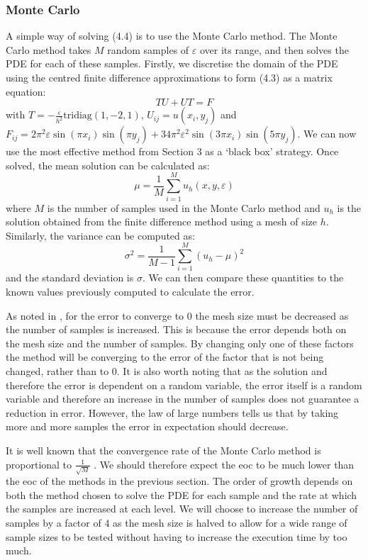 \documentclass[11pt]{article}
\numberwithin{equation}{section}
\begin{document}
\subsubsection{Monte Carlo}
A simple way of solving (4.4) is to use the Monte Carlo method. The Monte Carlo method takes $M$ random samples of $\varepsilon$ over its range, and then solves the PDE for each of these samples. Firstly, we discretise the domain of the PDE using the centred finite difference approximations to form (4.3) as a matrix equation:
\begin{equation}
TU + UT = F
\end{equation}
with $T = -\frac{\varepsilon}{h^2} \text{tridiag}(1,-2,1)$, $U_{ij} = u(x_i, y_j)$ and $F_{ij} = 2\pi^2 \varepsilon \sin(\pi x_i) \sin(\pi y_j)+ 34 \pi^2 \varepsilon^2 \sin(3 \pi x_i) \sin(5 \pi y_j)$. We can now use the most effective method from Section 3 as a `black box' strategy. Once solved, the mean solution can be calculated as:
\begin{equation}
\mu = \frac{1}{M} \sum_{i=1}^M u_h (x, y, \varepsilon)
\end{equation}
where $M$ is the number of samples used in the Monte Carlo method and $u_h$ is the solution obtained from the finite difference method using a mesh of size $h$. Similarly, the variance can be computed as:
\begin{equation}
\sigma^2 = \frac{1}{M-1}\sum_{i=1}^M (u_h - \mu)^2
\end{equation}
and the standard deviation is $\sigma$. We can then compare these quantities to the known values previously computed to calculate the error.

As noted in \cite{Bishop}, for the error to converge to 0 the mesh size must be decreased as the number of samples is increased. This is because the error depends both on the mesh size and the number of samples. By changing only one of these factors the method will be converging to the error of the factor that is not being changed, rather than to 0. It is also worth noting that as the solution and therefore the error is dependent on a random variable, the error itself is a random variable and therefore an increase in the number of samples does not guarantee a reduction in error. However, the law of large numbers tells us that by taking more and more samples the error in expectation should decrease.

It is well known that the convergence rate of the Monte Carlo method is proportional to $\frac{1}{\sqrt{M}}$ \cite{Kalos}. We should therefore expect the eoc to be much lower than the eoc of the methods in the previous section. The order of growth depends on both the method chosen to solve the PDE for each sample and the rate at which the samples are increased at each level. We will choose to increase the number of samples by a factor of 4 as the mesh size is halved to allow for a wide range of sample sizes to be tested without having to increase the execution time by too much.
\end{document}
